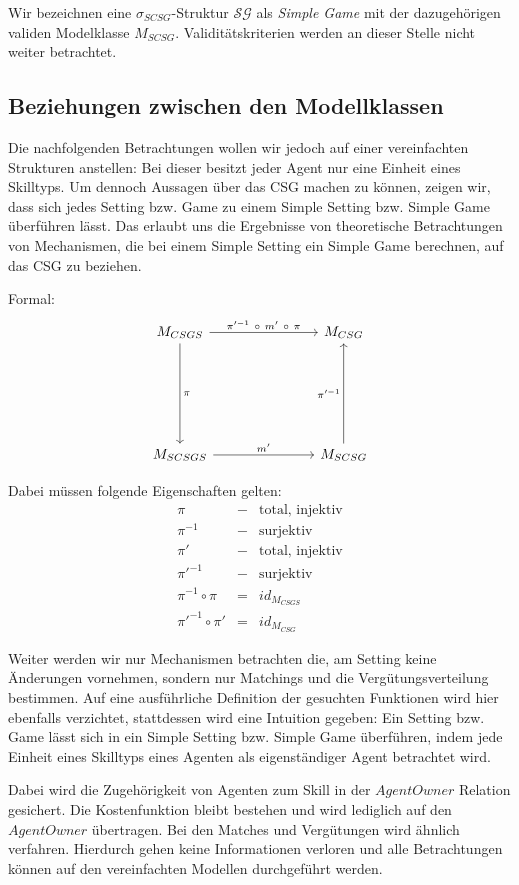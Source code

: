\noindent
Wir bezeichnen eine $\sigma_{SCSG}$-Struktur $\mathcal{SG}$ als \textit{Simple Game} mit der dazugehörigen validen Modelklasse $M_{SCSG}$. Validitätskriterien werden an dieser Stelle nicht weiter betrachtet.


\subsection{Beziehungen zwischen den Modellklassen}
\label{bez}

Die nachfolgenden Betrachtungen wollen wir jedoch auf einer vereinfachten Strukturen anstellen: Bei  dieser besitzt jeder Agent nur eine Einheit eines Skilltyps. Um dennoch Aussagen über das CSG machen zu können, zeigen wir, dass sich jedes Setting bzw. Game zu einem Simple Setting bzw. Simple Game überführen lässt. Das erlaubt uns die Ergebnisse von  theoretische Betrachtungen von Mechanismen, die bei einem Simple Setting ein Simple Game berechnen, auf das CSG zu beziehen.


\noindent
Formal:
\[
\begin{tikzcd}[column sep=1in,row sep=1in]
M_{CSGS} \arrow{d}{\pi} \arrow{r}{\pi'^{-1}\ \circ\  m'\ \circ\ \pi} & M_{CSG} \\
M_{SCSGS} \arrow{r}{m'} & M_{SCSG} \arrow{u}{\pi'^{-1}}
\end{tikzcd}
\]

\noindent
Dabei müssen folgende Eigenschaften gelten:
\begin{eqnarray}
  \pi &-&\text{total, injektiv} \\
  \pi^{-1}&-&\text{surjektiv} \\
  \pi' &-&\text{total, injektiv} \\
  \pi'^{-1}&-&\text{surjektiv} \\
  \pi^{-1}\circ\pi &=& id_{M_{CSGS}} \\
  \pi'^{-1}\circ\pi' &=& id_{M_{CSG}}
\end{eqnarray}

\noindent
Weiter werden wir nur Mechanismen betrachten die, am Setting keine Änderungen vornehmen, sondern nur Matchings und die Vergütungsverteilung bestimmen. Auf eine ausführliche Definition der gesuchten Funktionen wird hier ebenfalls verzichtet,  stattdessen wird eine Intuition gegeben: Ein Setting bzw. Game lässt sich in ein Simple Setting bzw. Simple Game überführen, indem jede Einheit eines Skilltyps eines Agenten als eigenständiger Agent betrachtet wird.

Dabei wird die Zugehörigkeit von Agenten zum Skill in der $AgentOwner$ Relation gesichert. Die Kostenfunktion bleibt bestehen und wird lediglich auf den $AgentOwner$ übertragen. Bei den Matches und Vergütungen wird ähnlich verfahren. Hierdurch gehen keine Informationen verloren und alle Betrachtungen können auf den vereinfachten Modellen durchgeführt werden.



